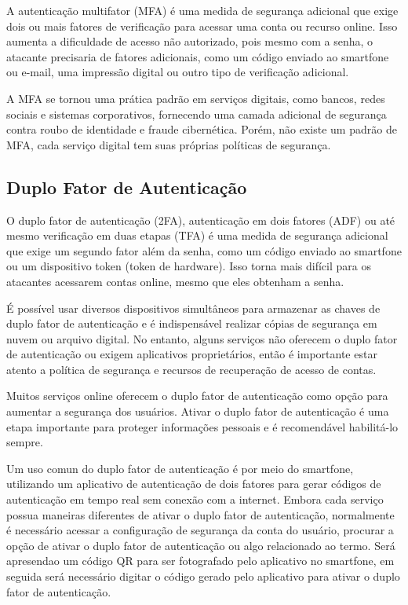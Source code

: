 \documentclass[12pt]{article}
\begin{document}
A autenticação multifator (MFA) é uma medida de segurança adicional que
exige dois ou mais fatores de verificação para acessar uma conta ou
recurso online.
Isso aumenta a dificuldade de acesso não autorizado, pois mesmo com a
senha, o atacante precisaria de fatores adicionais, como um código
enviado ao smartfone ou e-mail, uma impressão digital ou outro tipo de
verificação adicional.

A MFA se tornou uma prática padrão em serviços digitais, como bancos,
redes sociais e sistemas corporativos, fornecendo uma camada adicional
de segurança contra roubo de identidade e fraude cibernética.
Porém, não existe um padrão de MFA, cada serviço digital tem suas
próprias políticas de segurança.

\subsection{Duplo Fator de Autenticação}

O duplo fator de autenticação (2FA), autenticação em dois fatores (ADF) ou
até mesmo verificação em duas etapas (TFA) é uma medida de segurança
adicional que exige um segundo fator além da senha, como um código enviado
ao smartfone ou um dispositivo token (token de hardware).
Isso torna mais difícil para os atacantes acessarem contas online, mesmo
que eles obtenham a senha.

É possível usar diversos dispositivos simultâneos para armazenar as chaves
de duplo fator de autenticação e é indispensável realizar cópias de
segurança em nuvem ou arquivo digital.
No entanto, alguns serviços não oferecem o duplo fator de autenticação ou
exigem aplicativos proprietários, então é importante estar atento a
política de segurança e recursos de recuperação de acesso de contas.

Muitos serviços online oferecem o duplo fator de autenticação como opção
para aumentar a segurança dos usuários.
Ativar o duplo fator de autenticação é uma etapa importante para proteger
informações pessoais e é recomendável habilitá-lo sempre.

Um uso comun do duplo fator de autenticação é por meio do smartfone,
utilizando um aplicativo de autenticação de dois fatores para gerar
códigos de autenticação em tempo real sem conexão com a internet.
Embora cada serviço possua maneiras diferentes de ativar o duplo fator
de autenticação, normalmente é necessário acessar a configuração de
segurança da conta do usuário, procurar a opção de ativar o duplo fator
de autenticação ou algo relacionado ao termo.
Será apresendao um código QR para ser fotografado pelo aplicativo no
smartfone, em seguida será necessário digitar o código gerado pelo
aplicativo para ativar o duplo fator de autenticação.
\end{document}
